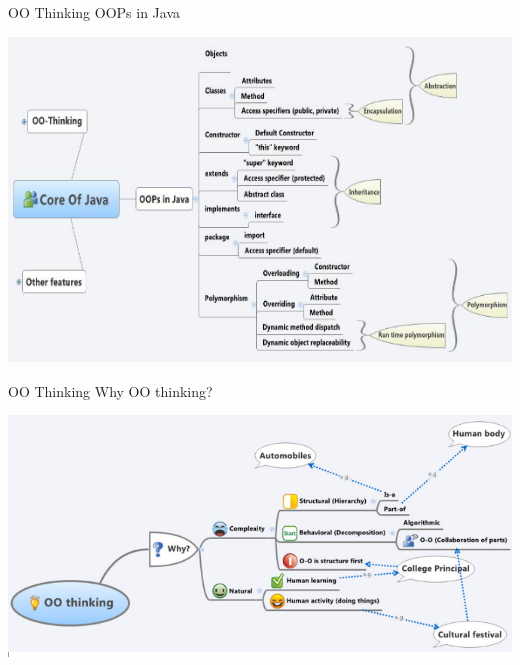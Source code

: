 \documentclass[14pt]{beamer}
\begin{document}
\begin{frame}{OO Thinking}
OOPs in Java
\begin{center}
    \includegraphics[scale=0.5]{Image3.png}
  \end{center}
\end{frame}

\begin{frame}{OO Thinking}
Why OO thinking?
\begin{center}
    \includegraphics[scale=0.5]{Image4.png}
  \end{center}
\end{frame}
\end{document}
